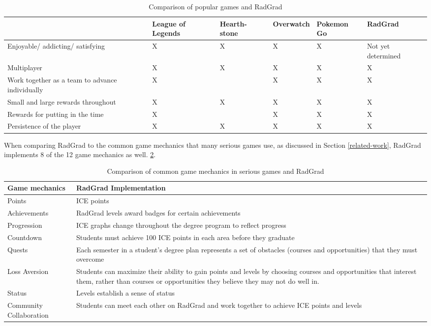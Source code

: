 \begin{table}[htbp!]
\centering
 \caption{Comparison of popular games and RadGrad}
\begin{tabular}{ |p{3cm}|p{2cm}|p{2cm}|p{2cm}|p{2cm}|p{2cm}| } 
  \hline
 \textbf{} & \textbf{League of Legends} & \textbf{Hearth- stone} & \textbf{Overwatch} & \textbf{Pokemon Go} & \textbf{RadGrad} \\ 
  \hline
  Enjoyable/ addicting/ satisfying & X & X & X & X & Not yet determined\\
  \hline
   Multiplayer & X & X & X & X & X\\
  \hline
    Work together as a team to advance individually & X & & X & X & X\\
  \hline
    Small and large rewards throughout & X & X & X & X & X\\
  \hline
    Rewards for putting in the time & X &  & X & X & X\\
  \hline
    Persistence of the player & X & X & X & X & X\\
  \hline
\end{tabular}
  \label{gamification-compare}
\end{table}

When comparing RadGrad to the common game mechanics that many serious games use, as discussed in Section \ref{related-work}, RadGrad implements 8 of the 12 game mechanics as well. \ref{serious-games}. 

\begin{table}[htbp!]
\centering
 \caption{Comparison of common game mechanics in serious games and RadGrad}
\begin{tabular}{ |p{8cm}|p{8cm}| } 
  \hline
 \textbf{Game mechanics} & \textbf{RadGrad Implementation} \\ 
  \hline
   Points & ICE points \\ 
  \hline
   Achievements &  RadGrad levels award badges for certain achievements\\ 
  \hline
   Progression &  ICE graphs change throughout the degree program to reflect progress\\ 
  \hline
   Countdown & Students must achieve 100 ICE points in each area before they graduate \\ 
  \hline
   Quests & Each semester in a student's degree plan represents a set of obstacles (courses and opportunities) that they must overcome \\ 
  \hline
   Loss Aversion & Students can maximize their ability to gain points and levels by choosing courses and opportunities that interest them, rather than courses or opportunities they believe they may not do well in. \\ 
  \hline
  Status &  Levels establish a sense of status\\ 
  \hline
   Community Collaboration &  Students can meet each other on RadGrad and work together to achieve ICE points and levels\\ 
  \hline

\end{tabular}
  \label{serious-games}
\end{table}


